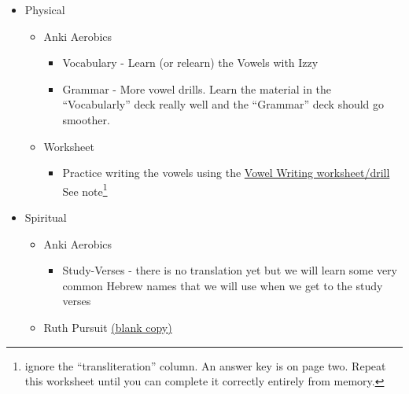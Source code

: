 \documentclass[
]{turabian-researchpaper}
\providecommand{\tightlist}{%
  \setlength{\itemsep}{0pt}\setlength{\parskip}{0pt}}
\begin{document}
\begin{itemize}
\tightlist
\item
  Physical

  \begin{itemize}
  \tightlist
  \item
    Anki Aerobics

    \begin{itemize}
    \tightlist
    \item
      Vocabulary - Learn (or relearn) the Vowels with Izzy
    \item
      Grammar - More vowel drills. Learn the material in the ``Vocabularly'' deck really well and the ``Grammar'' deck should go smoother.
    \end{itemize}
  \item
    Worksheet

    \begin{itemize}
    \tightlist
    \item
      Practice writing the vowels using the \href{https://drive.google.com/file/d/1ETPKE3u-XGfpNdKmlIr3P_DRbkOOlcI_/view?usp=sharing}{Vowel Writing worksheet/drill} See note\footnote{ignore the ``transliteration'' column. An answer key is on page two. Repeat this worksheet until you can complete it correctly entirely from memory.}
    \end{itemize}
  \end{itemize}
\item
  Spiritual

  \begin{itemize}
  \tightlist
  \item
    Anki Aerobics

    \begin{itemize}
    \tightlist
    \item
      Study-Verses - there is no translation yet but we will learn some very common Hebrew names that we will use when we get to the study verses
    \end{itemize}
  \item
    Ruth Pursuit \href{https://drive.google.com/file/d/1qcfTKAlTJGChC2eYCMhSbY2w-ibzCcDV/view?usp=sharing}{(blank copy)}


\end{itemize}
\end{itemize}
\end{document}
